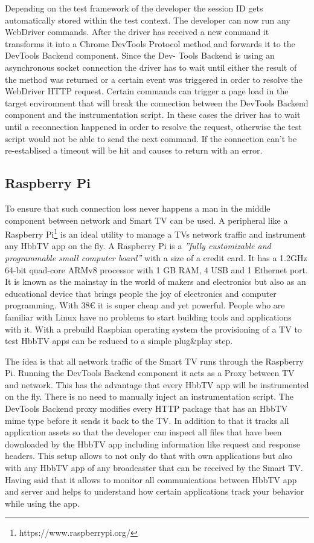 Depending on the test framework of the developer the session ID gets automatically stored within the
test context. The developer can now run any WebDriver commands. After the driver has received a new
command it transforms it into a Chrome DevTools Protocol method and forwards it to the DevTools
Backend component. Since the Dev- Tools Backend is using an asynchronous socket connection the driver
has to wait until either the result of the method was returned or a certain event was triggered in
order to resolve the WebDriver HTTP request. Certain commands can trigger a page load in the target
environment that will break the connection between the DevTools Backend component and the instrumentation
script. In these cases the driver has to wait until a reconnection happened in order to resolve the
request, otherwise the test script would not be able to send the next command. If the connection can't
be re-establised a timeout will be hit and causes to return with an error.

\subsection{Raspberry Pi\label{sec:pi}}

To ensure that such connection loss never happens a man in the middle component between network and
Smart TV can be used. A peripheral like a Raspberry Pi\footnote{https://www.raspberrypi.org/} is
an ideal utility to manage a TVs network traffic and instrument any HbbTV app on the fly. A
Raspberry Pi is a \textit{''fully customizable and programmable small computer board''}\cite{raspberrypi}
with a size of a credit card. It has a 1.2GHz 64-bit quad-core ARMv8 processor with 1 GB RAM,
4 USB and 1 Ethernet port. It is known as the mainstay in the world of makers and electronics but
also as an educational device that brings people the joy of electronics and computer programming.
With 38\euro{} it is super cheap and yet powerful. People who are familiar with Linux have no problems
to start building tools and applications with it. With a prebuild Raspbian operating system the
provisioning of a TV to test HbbTV apps can be reduced to a simple plug\&play step.

The idea is that all network traffic of the Smart TV runs through the Raspberry Pi. Running
the DevTools Backend component it acts as a Proxy between TV and network. This has the advantage
that every HbbTV app will be instrumented on the fly. There is no need to manually inject an
instrumentation script. The DevTools Backend proxy modifies every HTTP package that has an HbbTV
mime type before it sends it back to the TV. In addition to that it tracks all application assets
so that the developer can inspect all files that have been downloaded by the HbbTV app including
information like request and response headers. This setup allows to not only do that with own
applications but also with any HbbTV app of any broadcaster that can be received by the Smart TV.
Having said that it allows to monitor all communications between HbbTV app and server and helps
to understand how certain applications track your behavior while using the app.

